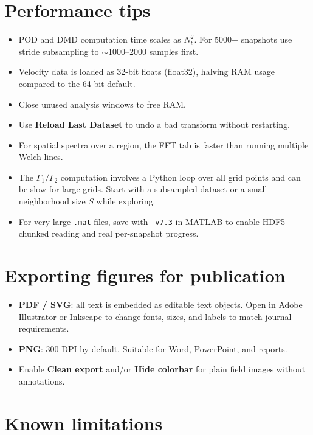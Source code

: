 \documentclass[11pt, a4paper]{report}
\newcommand{\uipth}[1]{\textbf{\textcolor{upblue}{#1}}}
\begin{document}
\section{Performance tips}

\begin{itemize}[leftmargin=1.5em]
  \item POD and DMD computation time scales as $N_t^2$. For 5000+ snapshots use stride subsampling to $\sim$1000--2000 samples first.
  \item Velocity data is loaded as 32-bit floats (float32), halving RAM usage compared to the 64-bit default.
  \item Close unused analysis windows to free RAM.
  \item Use \uipth{Reload Last Dataset} to undo a bad transform without restarting.
  \item For spatial spectra over a region, the FFT tab is faster than running multiple Welch lines.
  \item The $\Gamma_1/\Gamma_2$ computation involves a Python loop over all grid points and can be slow for large grids. Start with a subsampled dataset or a small neighborhood size $S$ while exploring.
  \item For very large \texttt{.mat} files, save with \texttt{-v7.3} in MATLAB to enable HDF5 chunked reading and real per-snapshot progress.
\end{itemize}

\section{Exporting figures for publication}

\begin{itemize}[leftmargin=1.5em]
  \item \textbf{PDF / SVG}: all text is embedded as editable text objects. Open in Adobe Illustrator or Inkscape to change fonts, sizes, and labels to match journal requirements.
  \item \textbf{PNG}: 300 DPI by default. Suitable for Word, PowerPoint, and reports.
  \item Enable \uipth{Clean export} and/or \uipth{Hide colorbar} for plain field images without annotations.
\end{itemize}

\section{Known limitations}
\end{document}
